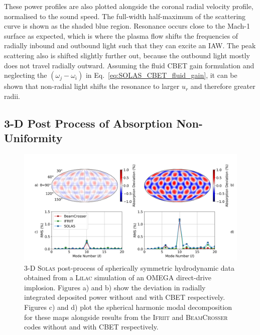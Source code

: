 These power profiles are also plotted alongside the coronal radial velocity profile, normalised to the sound speed.
The full-width half-maximum of the scattering curve is shown as the shaded blue region.
Resonance occurs close to the Mach-1 surface as expected, which is where the plasma flow shifts the frequencies of radially inbound and outbound light such that they can excite an \ac{IAW}.
The peak scattering also is shifted slightly further out, because the outbound light mostly does not travel radially outward.
Assuming the fluid \ac{CBET} gain formulation and neglecting the $(\omega_j-\omega_i)$ in Eq.~\ref{eq:SOLAS_CBET_fluid_gain}, it can be shown that non-radial light shifts the resonance to larger $u_r$ and therefore greater radii.

\subsection{3-D Post Process of Absorption Non-Uniformity}%
\label{sec:SOLAS_IFRIIT_test}

\begin{figure}[t!]
    \includegraphics[width=1.0\linewidth]{Numerics/Images/DepositionAsymmetries_mollweide_xy32.png}
    \centering
    \caption{3-D \textsc{Solas} post-process of spherically symmetric hydrodynamic data obtained from a \textsc{Lilac} simulation of an OMEGA direct-drive implosion.
    Figures a) and b) show the deviation in radially integrated deposited power without and with \ac{CBET} respectively.
    Figures c) and d) plot the spherical harmonic modal decomposition for these maps alongside results from the \textsc{Ifriit} and \textsc{BeamCrosser} codes without and with \ac{CBET} respectively.}%
    \label{fig:SOLAS_qpR_IFRIIT_test}
\end{figure}

